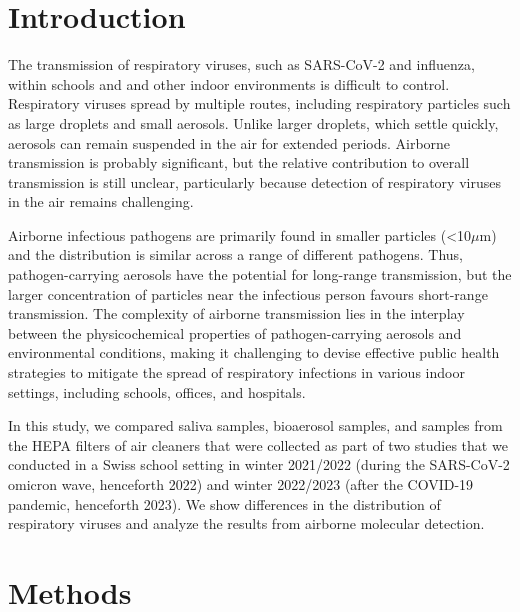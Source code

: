 \documentclass[fleqn,11pt]{wlscirep}
\begin{document}
\thispagestyle{empty}
\sloppy
\raggedbottom

\newpage

\setcounter{page}{1}

\section*{Introduction}

The transmission of respiratory viruses, such as SARS-CoV-2 and influenza, within schools and and other indoor environments is difficult to control\cite{Leung2020}. Respiratory viruses spread by multiple routes, including respiratory particles such as large droplets and small aerosols. Unlike larger droplets, which settle quickly, aerosols can remain suspended in the air for extended periods\cite{Wang2021}. Airborne transmission is probably significant, but the relative contribution to overall transmission is still unclear, particularly because detection of respiratory viruses in the air remains challenging\cite{Belser2023PLOSPath}.

Airborne infectious pathogens are primarily found in smaller particles (<10$\mu$m) and the distribution is similar across a range of different pathogens\cite{Fennelly2020}. Thus, pathogen-carrying aerosols have the potential for long-range transmission, but the larger concentration of particles near the infectious person favours short-range transmission\cite{Tellier2009JTRSI,Wang2020}. The complexity of airborne transmission lies in the interplay between the physicochemical properties of pathogen-carrying aerosols and environmental conditions\cite{Wang2021}, making it challenging to devise effective public health strategies to mitigate the spread of respiratory infections in various indoor settings, including schools, offices, and hospitals.

In this study, we compared saliva samples, bioaerosol samples, and samples from the HEPA filters of air cleaners that were collected as part of two studies that we conducted in a Swiss school setting in winter 2021/2022 (during the SARS-CoV-2 omicron wave, henceforth 2022)\cite{Banholzer2023PLoSMed} and winter 2022/2023 (after the COVID-19 pandemic, henceforth 2023)\cite{Banholzer2023submitted}. We show differences in the distribution of respiratory viruses and analyze the results from airborne molecular detection. 


\section*{Methods}
\end{document}

